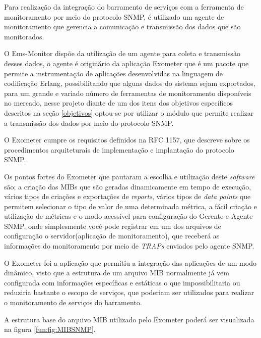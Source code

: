 Para realização da integração do barramento de serviços com a ferramenta de monitoramento por meio do protocolo \acrshort{SNMP}, é utilizado um agente de monitoramento que gerencia a comunicação e transmissão dos dados que são monitorados. 

O Ems-Monitor dispõe da utilização de um agente para coleta e transmissão desses dados, o agente é originário da aplicação Exometer que é um pacote que permite a instrumentação de aplicações desenvolvidas na linguagem de codificação Erlang, possibilitando que alguns dados do sistema sejam exportados, para um grande e variado número de ferramentas de monitoramento disponíveis no mercado\cite{exometer_core}, nesse projeto diante de um dos itens dos objetivos específicos descritos na seção \ref{objetivos} optou-se por utilizar o módulo que permite realizar a transmissão dos dados por meio do protocolo \acrshort{SNMP}. 

O Exometer cumpre os requisitos definidos na \acrshort{RFC} 1157, que descreve sobre os procedimentos arquiteturais de implementação e implantação do protocolo \acrshort{SNMP}. 

Os pontos fortes do Exometer que pautaram a escolha e utilização deste \textit{software} são; a criação das \acrshort{MIBs} que são geradas dinamicamente em tempo de execução, vários tipos de criações e exportações de \textit{reports}, vários tipos de \textit{data points} que permitem selecionar o tipo de valor de uma determinada métrica, a fácil criação e utilização de métricas e o modo acessível para configuração do Gerente e Agente \acrshort{SNMP}, onde simplesmente você pode registrar em um dos arquivos de configuração o servidor(aplicação de monitoramento), que receberá as informações do monitoramento por meio de \textit{TRAPs} enviados pelo agente \acrshort{SNMP}. 

O Exometer foi a aplicação que permitiu a integração das aplicações de um modo dinâmico, visto que a estrutura de um arquivo MIB normalmente já vem configurada com informações específicas e estáticas o que impossibilitaria ou reduziria bastante o escopo de serviços, que poderiam ser utilizados para realizar o monitoramento de serviços do barramento. 

A estrutura base do arquivo MIB utilizado pelo Exometer poderá ser visualizada na figura \ref{fun:fig:MIBSNMP}. 

